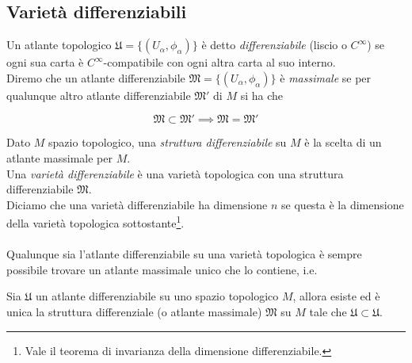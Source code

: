 \subsection{Varietà differenziabili}

Un atlante topologico $ \mathfrak{U} = \{(U_{\alpha},\phi_{\alpha})\} $ è detto \textit{differenziabile} (liscio o $ C^{\infty} $) se ogni sua carta è $ C^{\infty} $-compatibile con ogni altra carta al suo interno.\\
Diremo che un atlante differenziabile $ \mathfrak{M} = \{(U_{\alpha},\phi_{\alpha})\} $ è \textit{massimale} se per qualunque altro atlante differenziabile $ \mathfrak{M}' $ di $ M $ si ha che

\begin{equation}
	\mathfrak{M} \subset \mathfrak{M}' \implies \mathfrak{M} = \mathfrak{M}'
\end{equation}

Dato $ M $ spazio topologico, una \textit{struttura differenziabile} su $ M $ è la scelta di un atlante massimale per $ M $.\\
Una \textit{varietà differenziabile} è una varietà topologica con una struttura differenziabile $ \mathfrak{M} $.\\
Diciamo che una varietà differenziabile ha dimensione $ n $ se questa è la dimensione della varietà topologica sottostante\footnote{%
	Vale il teorema di invarianza della dimensione differenziabile.%
}.\\\\
%
Qualunque sia l'atlante differenziabile su una varietà topologica è sempre possibile trovare un atlante massimale unico che lo contiene, i.e.

\begin{definition}
	Sia $ \mathfrak{U} $ un atlante differenziabile su uno spazio topologico $ M $, allora esiste ed è unica la struttura differenziale (o atlante massimale) $ \mathfrak{M} $ su $ M $ tale che $ \mathfrak{U} \subset \mathfrak{U} $.
\end{definition}

